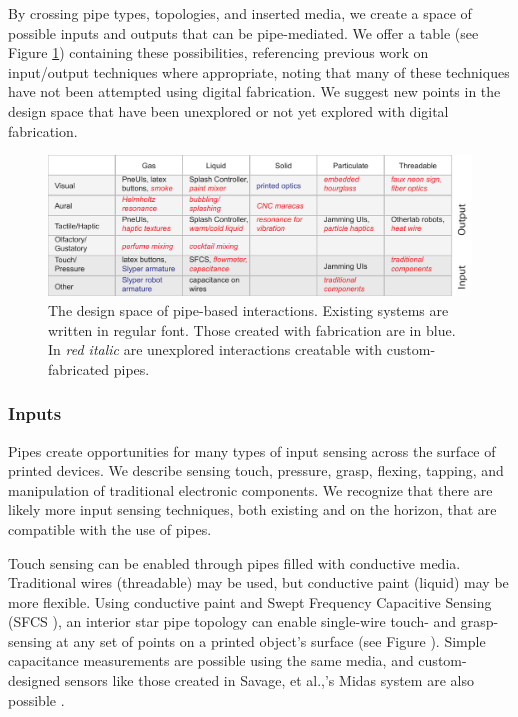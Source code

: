 

By crossing pipe types, topologies, and inserted media, we create a space of possible inputs and outputs that can be pipe-mediated.  We offer a table (see Figure \ref{fig:designspace}) containing these possibilities, referencing previous work on input/output techniques where appropriate, noting that many of these techniques have not been attempted using digital fabrication.  We suggest new points in the design space that have been unexplored or not yet explored with digital fabrication.

\begin{figure}[t]
\centering
    \includegraphics[width=\textwidth]{figures/designspace.pdf}
\caption{The design space of pipe-based interactions.  Existing systems are written in regular font.  Those created with fabrication are in {\color{blue}blue}. In \emph{{\color{red}red italic}} are unexplored interactions creatable with custom-fabricated pipes. }
\label{fig:designspace}
\end{figure}

\subsubsection{Inputs}

Pipes create opportunities for many types of input sensing across the surface of printed devices.  We describe sensing touch, pressure, grasp, flexing, tapping, and manipulation of traditional electronic components.  We recognize that there are likely more input sensing techniques, both existing and on the horizon, that are compatible with the use of pipes.

Touch sensing can be enabled through pipes filled with conductive media.  Traditional wires (threadable) may be used, but conductive paint (liquid) may be more flexible.  Using conductive paint and Swept Frequency Capacitive Sensing (SFCS \cite{Sato-touche}), an interior star pipe topology can enable single-wire touch- and grasp-sensing at any set of points on a printed object's surface (see Figure \cite{fig:toy}).  Simple capacitance measurements are possible using the same media, and custom-designed sensors like those created in Savage, et al.,'s Midas system are also possible \cite{Savage-midas}.

